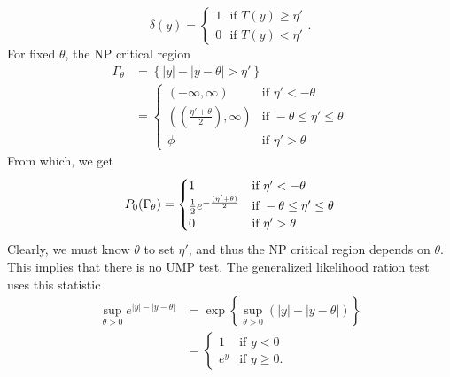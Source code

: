 \documentclass[a4paper,english,12pt]{article}
\begin{document}
\begin{enumerate}[label=(\alph*).]
\begin{equation*}
\delta(y)=\begin{cases}
1~~~\mbox{if }T(y)\geq \eta'\\
0~~~\mbox{if }T(y)< \eta'
\end{cases}.
\end{equation*}
For fixed $\theta$, the NP critical region
\begin{align*}
\Gamma_{\theta}&=\left\{|y|-|y-\theta|>\eta'\right\} \\
			  &=\begin{cases}
						(-\infty,\infty)  & \mbox{if } \eta'<-\theta\\
						((\frac{\eta'+\theta}{2}),\infty) & \mbox{if } -\theta\leq\eta'\leq\theta\\
						\phi & \mbox{if } \eta'>\theta
			  \end{cases}
\end{align*}
From which, we get
\begin{equation*}
\mathnormal{P}_0(\Gamma_{\theta})=
\begin{cases}
1 & \mbox{if } \eta'<-\theta\\
\frac{1}{2}e^{-\frac{(\eta'+\theta)}{2}} & \mbox{if } -\theta\leq\eta'\leq\theta\\
0 & \mbox{if } \eta'>\theta
\end{cases}
\end{equation*}
Clearly, we must know $\theta$ to set $\eta'$, and thus the NP critical region depends on $\theta$. This implies that there is no UMP test. The generalized likelihood ration test uses this statistic 
\begin{align*}
\sup_{\theta>0}e^{|y|-|y-\theta|}&=\exp\left\{\sup_{\theta>0}(|y|-|y-\theta|)\right\} \\
			  &=\begin{cases}
						1  & \mbox{if } y<0\\
						e^{y} & \mbox{if } y\geq 0.
			  \end{cases}			 
\end{align*}
\end{enumerate}
\end{document}
